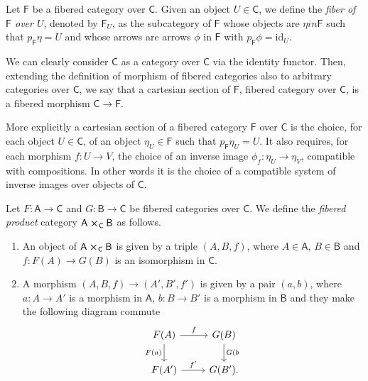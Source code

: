 \documentclass[../Main]{subfiles}
\begin{document}
\begin{defn}[Fiber]
	Let $\mathsf{F}$ be a fibered category over $\mathsf{C}$.
	Given an object $U \in \mathsf{C}$, we define the {\em fiber of 
	$\mathsf{F}$ over $U$}, denoted by $\mathsf{F}_U$, as the subcategory
	of $\mathsf{F}$ whose objects are $\eta in \mathsf{F}$
	such that $p_{\mathsf{F}} \eta = U$ and whose arrows
	are arrows $\phi$ in $\mathsf{F}$ with $p_{\mathsf{F}} \phi = \mathrm{id}_{ U }$.
\end{defn}


\begin{defn}
	We can clearly consider $\mathsf{C}$ as a category over $\mathsf{C}$
	via the identity functor.
	Then, extending the definition of morphism of fibered categories also
	to arbitrary categories over $\mathsf{C}$, we say that
	a cartesian section of $\mathsf{F}$, fibered category over $\mathsf{C}$,
	is a fibered morphism $\mathsf{C} \to \mathsf{F}$.
\end{defn}

\begin{rem}[]
	More explicitly a cartesian section of a fibered category $\mathsf{F}$
	over $\mathsf{C}$ is the choice, for each object $U \in \mathsf{C}$,
	of an object $\eta_U \in \mathsf{F}$ such that $p_{\mathsf{F}} \eta_U = U$.
	It also requires, for each morphism $f\colon U \to V$, the choice of
	an inverse image $\phi_f\colon \eta_U \to \eta_V$,
	compatible with compositions.
	In other words it is the choice of a compatible
	system of inverse images over objects of $\mathsf{C}$.
\end{rem}


\begin{defn}
	Let $F\colon \mathsf{A} \to \mathsf{C}$ and $G\colon \mathsf{B} \to \mathsf{C}$
	be fibered categories over $\mathsf{C}$. 
	We define the {\em fibered product} category $\mathsf{A} \cross_{ \mathsf{C} } \mathsf{B}$
	as follows.
\begin{enumerate}
	\item An object of $\mathsf{A} \cross_{ \mathsf{C} } \mathsf{B}$ is given by a triple
		$\left(A, B, f\right)$, where $A \in \mathsf{A}$, $B \in \mathsf{B}$
		and $f\colon F(A) \to G(B)$ is an isomorphism in $\mathsf{C}$.

	\item A morphism $\left(A, B, f\right) \to  \left(A', B', f'\right)$
		is given by a pair $\left(a, b\right)$,
		where $a\colon A \to A'$ is a morphism in $\mathsf{A}$,
		$b\colon B \to B'$ is a morphism in $\mathsf{B}$
		and they make the following diagram commute
		\begin{equation*}
		\begin{tikzcd}
			F(A) \arrow[r, "f", rightarrow] 
			\arrow[d, "F(a)"', rightarrow] &
			G(B) \arrow[d, "G(b", rightarrow] \\
			F(A') \arrow[r, "f'", rightarrow] &
			G(B')
		.\end{tikzcd}
		\end{equation*}
\end{enumerate}
\end{defn}
\end{document}
